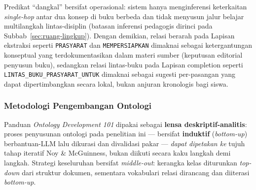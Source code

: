 \documentclass[../../thesis]{subfiles}
\begin{document}
Predikat ``dangkal'' bersifat operasional: sistem hanya menginferensi
keterkaitan \textit{single-hop} antar dua konsep di buku berbeda dan
tidak menyusun jalur belajar multilangkah lintas-disiplin (batasan
inferensi pedagogis dirinci pada Subbab~\ref{sec:ruang-lingkup}).
Dengan demikian, relasi berarah pada Lapisan ekstraksi seperti
\texttt{PRASYARAT} dan \texttt{MEMPERSIAPKAN} dimaknai sebagai
ketergantungan konseptual yang terdokumentasikan dalam materi sumber
(keputusan editorial penyusun buku), sedangkan relasi lintas-buku pada Lapisan
completion seperti \texttt{LINTAS\_BUKU\_PRASYARAT\_UNTUK} dimaknai sebagai
sugesti per-pasangan yang dapat dipertimbangkan secara lokal, bukan anjuran
kronologis bagi siswa.

\subsubsection{Metodologi Pengembangan Ontologi}

Panduan \textit{Ontology Development 101} \parencite{noy_ontology_2001} dipakai
sebagai \textbf{lensa deskriptif-analitis}: proses penyusunan ontologi pada
penelitian ini --- bersifat \textbf{induktif} (\textit{bottom-up})
berbantuan-LLM lalu dikurasi dan divalidasi pakar --- \textit{dapat dipetakan
ke} tujuh tahap iteratif Noy \& McGuinness, bukan diikuti secara kaku langkah
demi langkah. Strategi keseluruhan bersifat \textit{middle-out}: kerangka kelas
diturunkan \textit{top-down} dari struktur dokumen, sementara vokabulari relasi
dirancang dan diiterasi \textit{bottom-up}.
\end{document}
